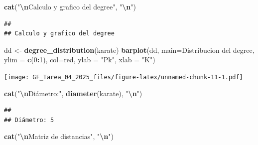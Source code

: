 \documentclass[
]{article}
\newenvironment{Shaded}{\begin{snugshade}}{\end{snugshade}}
\newcommand{\AttributeTok}[1]{\textcolor[rgb]{0.13,0.29,0.53}{#1}}
\newcommand{\DecValTok}[1]{\textcolor[rgb]{0.00,0.00,0.81}{#1}}
\newcommand{\FunctionTok}[1]{\textcolor[rgb]{0.13,0.29,0.53}{\textbf{#1}}}
\newcommand{\NormalTok}[1]{#1}
\newcommand{\OtherTok}[1]{\textcolor[rgb]{0.56,0.35,0.01}{#1}}
\newcommand{\SpecialCharTok}[1]{\textcolor[rgb]{0.81,0.36,0.00}{\textbf{#1}}}
\newcommand{\StringTok}[1]{\textcolor[rgb]{0.31,0.60,0.02}{#1}}
\begin{document}
\begin{Shaded}
\begin{Highlighting}[]
\FunctionTok{cat}\NormalTok{(}\StringTok{"}\SpecialCharTok{\textbackslash{}n}\StringTok{Calculo y grafico del degree"}\NormalTok{, }\StringTok{"}\SpecialCharTok{\textbackslash{}n}\StringTok{"}\NormalTok{)}
\end{Highlighting}
\end{Shaded}

\begin{verbatim}
## 
## Calculo y grafico del degree
\end{verbatim}

\begin{Shaded}
\begin{Highlighting}[]
\NormalTok{dd }\OtherTok{\textless{}{-}} \FunctionTok{degree\_distribution}\NormalTok{(karate)}
\FunctionTok{barplot}\NormalTok{(dd, }\AttributeTok{main=}\StringTok{\textquotesingle{}Distribucion del degree\textquotesingle{}}\NormalTok{, }\AttributeTok{ylim =} \FunctionTok{c}\NormalTok{(}\DecValTok{0}\SpecialCharTok{:}\DecValTok{1}\NormalTok{), }\AttributeTok{col=}\StringTok{\textquotesingle{}red\textquotesingle{}}\NormalTok{, }\AttributeTok{ylab =} \StringTok{"Pk"}\NormalTok{, }\AttributeTok{xlab =} \StringTok{"K"}\NormalTok{)}
\end{Highlighting}
\end{Shaded}

\texttt{[image: GF\_Tarea\_04\_2025\_files/figure-latex/unnamed-chunk-11-1.pdf]}

\begin{Shaded}
\begin{Highlighting}[]
\FunctionTok{cat}\NormalTok{(}\StringTok{"}\SpecialCharTok{\textbackslash{}n}\StringTok{Diámetro:"}\NormalTok{, }\FunctionTok{diameter}\NormalTok{(karate), }\StringTok{"}\SpecialCharTok{\textbackslash{}n}\StringTok{"}\NormalTok{)}
\end{Highlighting}
\end{Shaded}

\begin{verbatim}
## 
## Diámetro: 5
\end{verbatim}

\begin{Shaded}
\begin{Highlighting}[]
\FunctionTok{cat}\NormalTok{(}\StringTok{"}\SpecialCharTok{\textbackslash{}n}\StringTok{Matriz de distancias"}\NormalTok{, }\StringTok{"}\SpecialCharTok{\textbackslash{}n}\StringTok{"}\NormalTok{)}
\end{Highlighting}
\end{Shaded}
\end{document}
